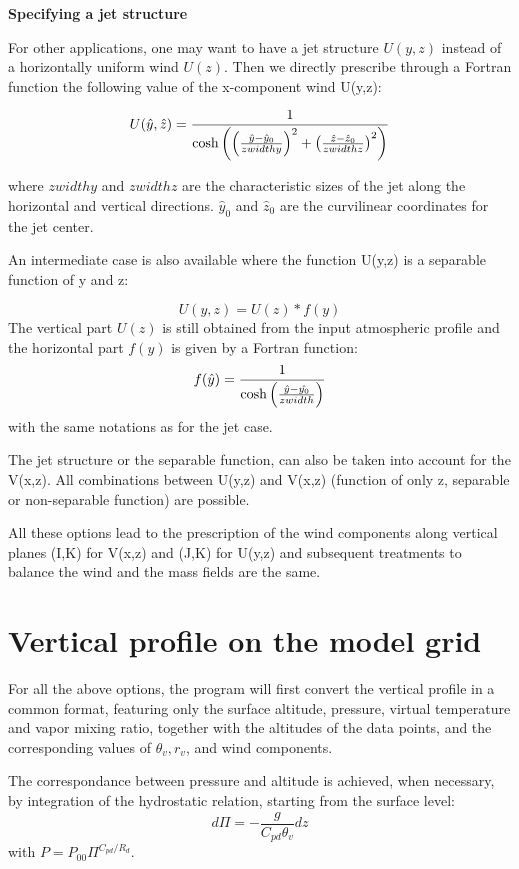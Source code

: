 {\bf Specifying a jet structure}

For other applications, one may want to have a jet structure $U(y,z)$ instead
of a horizontally uniform wind $U(z)$. Then we directly prescribe through
a Fortran function the following  value of the x-component wind U(y,z):

\begin{equation}
U(\hat{y},\hat{z})= { 1 \over \cosh \left(
  \left( { \hat{y} - \hat{y}_0 \over zwidthy } \right) ^2 +
  \left( { \hat{z} - \hat{z}_0 \over zwidthz } \right) ^2
 \right) }
\end{equation}

where $ zwidthy$ and  $ zwidthz $ are the characteristic sizes of the jet along
the horizontal and vertical directions. $\hat{y}_0$ and $\hat{z}_0$ are the
curvilinear coordinates  for the jet center.

An intermediate case is also available where the function U(y,z) is a separable
function of y and z:

$$ U(y,z) = U(z) * f(y)$$
 The vertical part $ U(z)$  is still obtained from the input atmospheric profile and
the horizontal part $f(y)$ is given by a Fortran function:
\begin{equation}
 f(\hat{y}) = { 1 \over \cosh \left(
   { \hat{y} - \hat{y_0} \over zwidth } \right) }
\end{equation}
with the same notations as for the jet case.

The jet structure or the separable function, can also be taken into account for
the V(x,z). All combinations between U(y,z) and V(x,z) (function of only z,
separable or non-separable function) are possible.


All these options lead to the prescription of the wind components along vertical
planes (I,K) for V(x,z) and (J,K) for U(y,z) and subsequent treatments
to balance the wind and the mass fields are the same.

\section{Vertical profile on the model grid}

For all the above options, the program will first convert the vertical profile
 in a common format, featuring only the surface altitude, pressure, virtual
temperature and vapor mixing ratio, together with the altitudes of the
data points, and the corresponding values of $\theta_v, r_v$, and wind
components.

The correspondance between pressure and altitude is achieved, when necessary,
by integration of the hydrostatic relation, starting from the surface level:
\begin{equation}
d \Pi = - \dfrac{g}{C_{pd} \theta_{v}}  dz
\end{equation}
with $P = P_{00} \Pi^{C_{pd}/R_{d}} $.

